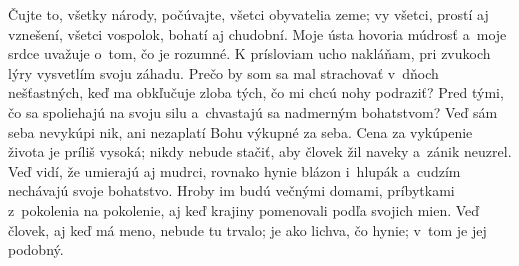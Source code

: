 Čujte to, všetky národy,
počúvajte, všetci obyvatelia zeme;
\versseparator
vy všetci, prostí aj vznešení,
všetci vospolok, bohatí aj chudobní.
\versseparator
Moje ústa hovoria múdrosť
a~moje srdce uvažuje o~tom, čo je rozumné.
\versseparator
K prísloviam ucho nakláňam,
pri zvukoch lýry vysvetlím svoju záhadu.
\versseparator
Prečo by som sa mal strachovať v~dňoch nešťastných,
keď ma obkľučuje zloba tých, čo mi chcú nohy podraziť?
\versseparator
Pred tými, čo sa spoliehajú na svoju silu
a~chvastajú sa nadmerným bohatstvom?
\versseparator
Veď sám seba nevykúpi nik,
ani nezaplatí Bohu výkupné za seba.
\versseparator
Cena za vykúpenie života je príliš vysoká;
nikdy nebude stačiť,
aby človek žil naveky a~zánik neuzrel.
\versseparator
Veď vidí, že umierajú aj mudrci,
rovnako hynie blázon i~hlupák
\versseparator
a~cudzím nechávajú svoje bohatstvo.
Hroby im budú večnými domami,
\versseparator
príbytkami z~pokolenia na pokolenie,
aj keď krajiny pomenovali podľa svojich mien.
\versseparator
Veď človek, aj keď má meno, nebude tu trvalo;
je ako lichva, čo hynie;
v~tom je jej podobný. 